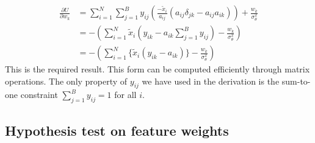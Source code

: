 \begin{align}
	\frac{\partial U}{\partial w_k} &= 
	\sum_{i=1}^{N} \sum_{j=1}^{B} y_{ij} 
	\left( \frac{-\tilde{x}_i}{a_{ij}} \left( a_{ij} \delta_{jk} - a_{ij} a_{ik} \right) \right)
	+ \frac{w_k}{\sigma_\theta^2} \nonumber \\
	&=  - \left( \sum_{i=1}^{N} \tilde{x}_i \left( y_{ik} - a_{ik} \sum_{j=1}^{B} y_{ij} \right)
	- \frac{w_k}{\sigma_\theta^2} \right) \nonumber \\
	&= - \left( \sum_{i=1}^{N} \Big\{ \tilde{x}_i (y_{ik} - a_{ik}) \Big\} - \frac{w_k}{\sigma_\theta^2} \right)
\end{align}
%
This is the required result. This form can be computed efficiently through matrix operations. The only property of $y_{ij}$ we have used in the derivation is the sum-to-one constraint $\sum_{j=1}^{B} y_{ij} = 1$ for all $i$.

\subsection{Hypothesis test on feature weights}
\label{appdx:hyp-test}

